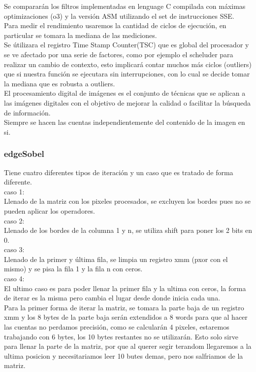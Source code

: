 
Se compararán los filtros implementadas en lenguage C compilada con máximas optimizaciones (o3) y la versión ASM utilizando el set de instrucciones
SSE. \\
Para medir el rendimiento usaremos la cantidad de ciclos de ejecución, en particular se tomara la mediana de las mediciones.\\
Se útilizara el registro Time Stamp Counter(TSC) que es global del procesador y se ve afectado por una serie de factores,
como por ejemplo el scheluder para realizar un cambio de contexto, esto implicará contar muchos más ciclos (outliers)
 que si nuestra función se ejecutara sin interrupciones, con lo cual se decide tomar la mediana que es robusta a outliers.\\
El procesamiento digital de imágenes es el conjunto de técnicas que se aplican a las imágenes digitales con el objetivo de mejorar la calidad o facilitar la búsqueda de información. 
\\
Siempre se hacen las cuentas independientemente del contenido de la imagen en si.\\

\subsubsection{edgeSobel}
Tiene cuatro diferentes tipos de iteraci\'on y un caso que es tratado de forma diferente.\\
caso 1:\\
	Llenado de la matriz con los pixeles procesados, se excluyen los bordes pues no se pueden aplicar los operadores.\\
caso 2:\\
	Llenado de los bordes de la columna 1 y n, se utiliza shift para poner los 2 bits en 0.\\
caso 3:\\
	Llenado de la primer y última fila, se limpia un registro xmm (pxor con el mismo) y se pisa la fila 1 y la fila n con ceros.\\
caso 4:\\
	El ultimo caso es para poder llenar la primer fila y la ultima con ceros, la forma de iterar es la misma pero cambia el lugar desde donde inicia cada una.\\

Para la primer forma de iterar la matriz, se tomara la parte baja de un registro xmm y los 8 bytes de la parte baja serán extendidos a 8 words para que al hacer las cuentas no perdamos precisión, como se calcularán 4 pixeles, estaremos trabajando con 6 bytes, los 10 bytes restantes no se utilizarán. Esto solo sirve para llenar la parte de la matriz, por que al querer segir terandom llegaremos a la ultima posicion y necesitariamos leer 10 butes demas, pero nos salfriamos de la matriz.\\

